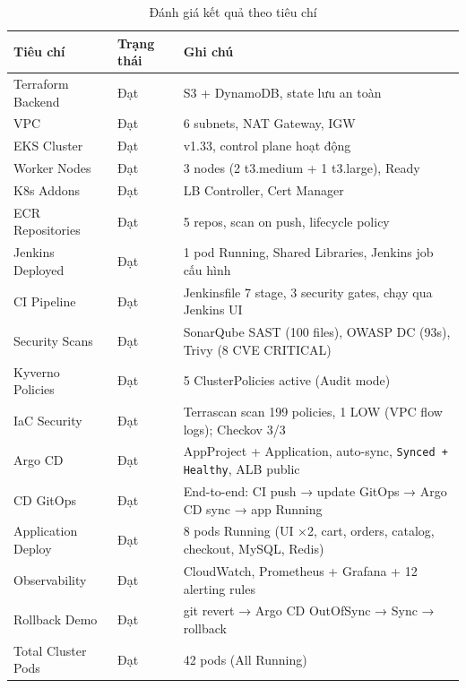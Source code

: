 \documentclass[13pt,a4paper,twoside]{extarticle}
\begin{document}
\begin{table}[H]
\centering
\begin{tabular}{@{}p{5cm} p{3cm} p{7cm}@{}}
\toprule
\textbf{Tiêu chí} & \textbf{Trạng thái} & \textbf{Ghi chú} \\
\midrule
Terraform Backend & Đạt & S3 + DynamoDB, state lưu an toàn \\
VPC & Đạt & 6 subnets, NAT Gateway, IGW \\
EKS Cluster & Đạt & v1.33, control plane hoạt động \\
Worker Nodes & Đạt & 3 nodes (2 t3.medium + 1 t3.large), Ready \\
K8s Addons & Đạt & LB Controller, Cert Manager \\
ECR Repositories & Đạt & 5 repos, scan on push, lifecycle policy \\
Jenkins Deployed & Đạt & 1 pod Running, Shared Libraries, Jenkins job cấu hình \\
CI Pipeline & Đạt & Jenkinsfile 7 stage, 3 security gates, chạy qua Jenkins UI \\
Security Scans & Đạt & SonarQube SAST (100 files), OWASP DC (93s), Trivy (8 CVE CRITICAL) \\
Kyverno Policies & Đạt & 5 ClusterPolicies active (Audit mode) \\
IaC Security & Đạt & Terrascan scan 199 policies, 1 LOW (VPC flow logs); Checkov 3/3 \\
Argo CD & Đạt & AppProject + Application, auto-sync, \texttt{Synced + Healthy}, ALB public \\
CD GitOps & Đạt & End-to-end: CI push → update GitOps → Argo CD sync → app Running \\
Application Deploy & Đạt & 8 pods Running (UI ×2, cart, orders, catalog, checkout, MySQL, Redis) \\
Observability & Đạt & CloudWatch, Prometheus + Grafana + 12 alerting rules \\
Rollback Demo & Đạt & git revert → Argo CD OutOfSync → Sync → rollback \\
Total Cluster Pods & Đạt & 42 pods (All Running) \\
\bottomrule
\end{tabular}
\caption{Đánh giá kết quả theo tiêu chí}
\label{tab:evaluation}
\end{table}

\newpage

\end{document}
